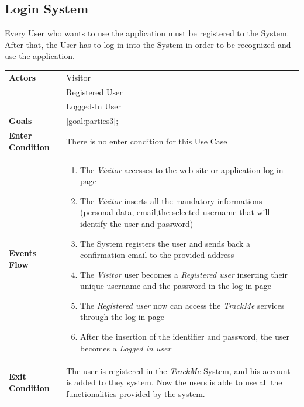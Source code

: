   \subsection{Login System}
Every User who wants to use the application must be registered to the System.
After that, the User has to log in into the System in order to be recognized and use the application.

\begin{table}[H]
	\centering
    
    \begin{tabular}{|p{3.5cm}|p{10.3cm}|}
    
    \hline
    \textbf{\large{Actors}}  			& \tabitem Visitor 									\\
    				 					& \tabitem Registered User							\\
                     					& \tabitem Logged-In User 							\\
    \hline
    \textbf{\large{Goals}} 				& \ref{goal:parties3};\\
    
    \hline
    \textbf{\large{Enter Condition}}	& There is no enter condition for this Use Case		\\
    
    \hline
    \textbf{\large{Events Flow}}		& \begin{enumerate}[leftmargin=0.5cm]
                                          	\item The \emph{Visitor}  accesses to the web site or application log in page
                                            \item The \emph{Visitor} inserts all the mandatory informations (personal data, email,the selected username that will identify the user and password)
                                            \item The System registers the user and sends back a confirmation email to the provided address
                                            \item The \emph{Visitor} user becomes a \emph{Registered user} inserting their unique username and the password in the log in page   
                                            \item The \emph{Registered user} now can access the \emph{TrackMe} services through the log in page
                                            
                                            \item After the insertion of the identifier and password, the user becomes a \emph{Logged in user}
                                          \end{enumerate}
    										\\
    \hline
    \textbf{\large{Exit Condition}} 	& The user is registered in the \emph{TrackMe} System, and his account is added to they system. Now the users is able to use all the functionalities provided by the system. \\
    

\end{tabular}
\end{table}
